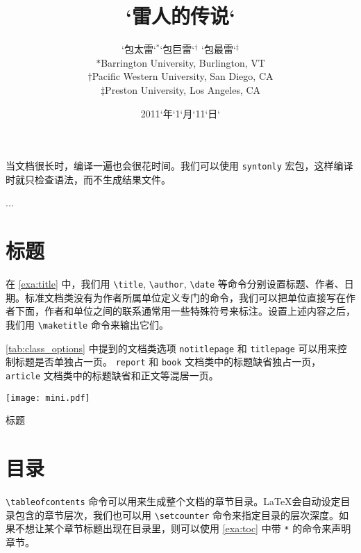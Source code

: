 当文档很长时，编译一遍也会很花时间。我们可以使用 \verb|syntonly| 宏包，这样编译时就只检查语法，而不生成结果文件。

\begin{Code}[numbers=none]
\usepackage{syntonly}
...
\syntaxonly
\end{Code}

\section{标题}

在 \autoref{exa:title} 中，我们用 \verb|\title|, \verb|\author|, \verb|\date| 等命令分别设置标题、作者、日期。标准文档类没有为作者所属单位定义专门的命令，我们可以把单位直接写在作者下面，作者和单位之间的联系通常用一些特殊符号来标注。设置上述内容之后，我们用 \verb|\maketitle| 命令来输出它们。

\autoref{tab:class_options} 中提到的文档类选项 \texttt{notitlepage} 和 \texttt{titlepage} 可以用来控制标题是否单独占一页。 \texttt{report} 和 \texttt{book} 文档类中的标题缺省独占一页，\texttt{article} 文档类中的标题缺省和正文等混居一页。

\begin{example}[h]
\begin{Code}[]
\title{`雷人的传说`}
\author{`包太雷`$^*$\quad `包巨雷`$^\dagger$\quad 
    `包最雷`$^\ddagger$\\[10pt]
$*$Barrington University, Burlington, VT\\
$\dagger$Pacific Western University, San Diego, CA\\
$\ddagger$Preston University, Los Angeles, CA}
\date{2011`年`1`月`11`日`}
\maketitle
\end{Code}
\begin{Demo}
\centering
\texttt{[image: mini.pdf]}
\end{Demo}
\caption{标题}
\label{exa:title}
\end{example}

\section{目录}

\verb|\tableofcontents| 命令可以用来生成整个文档的章节目录。\LaTeX 会自动设定目录包含的章节层次，我们也可以用 \verb|\setcounter| 命令来指定目录的层次深度。如果不想让某个章节标题出现在目录里，则可以使用 \autoref{exa:toc} 中带 \texttt{*} 的命令来声明章节。

